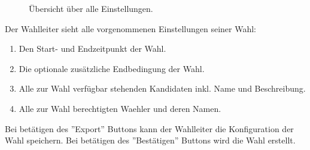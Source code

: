 \documentclass[parskip=full,11pt,twoside]{scrartcl}
\begin{document}
\begin{figure}[H]
	\caption{\label{fig:wlltr-done}
		Übersicht über alle Einstellungen.
	}
\end{figure}
Der Wahlleiter sieht alle vorgenommenen Einstellungen seiner Wahl:
\begin{enumerate}
	\item Den Start- und Endzeitpunkt der \gls{Wahl}.
	\item Die optionale zusätzliche Endbedingung der \gls{Wahl}.
	\item Alle zur \gls{Wahl} verfügbar stehenden Kandidaten inkl. Name und Beschreibung.
	\item Alle zur \gls{Wahl} berechtigten \gls{Waehler} und deren Namen.
\end{enumerate}
Bei betätigen des ''Export'' Buttons kann der \gls{Wahlleiter} die \gls{Konfiguration} der \gls{Wahl} speichern.
Bei betätigen des ''Bestätigen'' Buttons wird die \gls{Wahl} erstellt.
\end{document}
